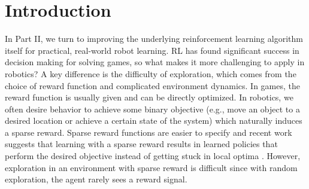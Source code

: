% 






\section{Introduction}

In Part II, we turn to improving the underlying reinforcement learning algorithm itself for practical, real-world robot learning.
RL has found significant success in decision making for solving games, so what makes it more challenging to apply in robotics? A key difference is the difficulty of exploration, which comes from  the choice of reward function and complicated environment dynamics. In games, the reward function is usually given and can be directly optimized. In robotics, we often desire behavior to achieve some binary objective (e.g., move an object to a desired location or achieve a certain state of the system) which naturally induces a sparse reward. Sparse reward functions are easier to specify and recent work suggests that learning with a sparse reward results in learned policies that perform the desired objective instead of getting stuck in local optima \citep{andrychowicz2017her, vecerik17ddpgfd}. However, exploration in an environment with sparse reward is difficult since with random exploration, the agent rarely sees a reward signal.

